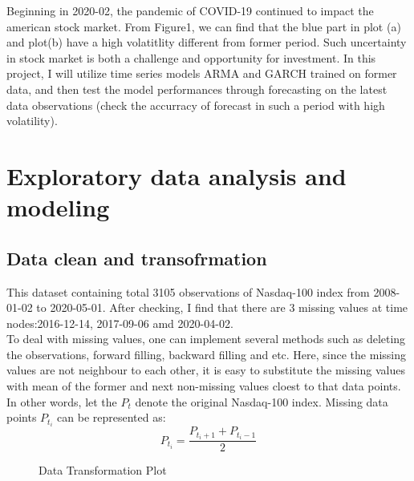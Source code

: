 \documentclass [letterpaper] {article}
\begin{document}
Beginning in 2020-02, the pandemic of COVID-19 continued to impact the american stock market. From Figure1, we can find that the blue part in plot (a) and plot(b) have a high volatitlity different from former period. Such uncertainty in stock market is both a challenge and opportunity for investment. In this project, I will utilize time series models ARMA and GARCH trained on former data, and then test the model performances through forecasting on the latest data observations (check the accurracy of forecast in such a period with high volatility).




\section{Exploratory data analysis and modeling}
\subsection{Data clean and transofrmation}
This dataset containing total 3105 observations of Nasdaq-100 index from 2008-01-02 to 2020-05-01. After checking, I find that there are 3 missing values at time nodes:2016-12-14, 2017-09-06 amd 2020-04-02.\\
\indent To deal with missing values, one can implement several methods such as deleting the observations, forward filling, backward filling and etc. Here, since the missing values are not neighbour to each other, it is easy to substitute the missing values with mean of the former and next non-missing values cloest to that data points.\\
\indent In other words, let the $P_t$ denote the original Nasdaq-100 index. Missing data points $P_{t_i}$ can be represented as:
\[
P_{t_i}=\frac {P_{t_i+1}+P_{t_i-1}}{2}
\]

\begin{figure}[htp]
	\centering
	\quad
	\caption{Data Transformation Plot}
\end{figure}
\end{document}
